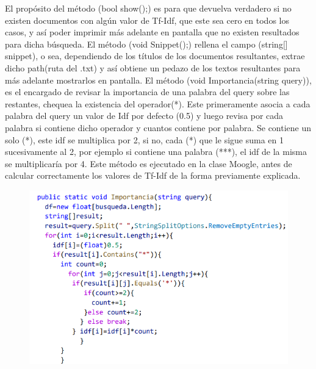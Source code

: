 \documentclass[a4paper,12pt]{article}
\begin{document}
El propósito del método (bool show();) es para que devuelva verdadero si no existen 
documentos con algún valor de Tf-Idf, que este sea cero en todos los casos, y así poder 
imprimir más adelante en pantalla que no existen resultados para dicha búsqueda. El método 
(void Snippet();) rellena el campo (string[] snippet), o sea, dependiendo de los títulos de los 
documentos resultantes, extrae dicho path(ruta del .txt) y así obtiene un pedazo de los textos 
resultantes para más adelante mostrarlos en pantalla. El método (void Importancia(string 
query)), es el encargado de revisar la importancia de una palabra del query sobre las restantes, 
chequea la existencia del operador(*). Este primeramente asocia a cada palabra del query un 
valor de Idf por defecto (0.5) y luego revisa por cada palabra si contiene dicho operador y 
cuantos contiene por palabra. Se contiene un solo (*), este idf se multiplica por 2, si no, cada 
(*) que le sigue suma en 1 sucesivamente al 2, por ejemplo si contiene una palabra (***), el idf 
de la misma se multiplicaría por 4. Este método es ejecutado en la clase Moogle, antes de 
calcular correctamente los valores de Tf-Idf de la forma previamente explicada.
\begin{figure}[h]
    \includegraphics*{code 6.png}
\end{figure}
\end{document}
